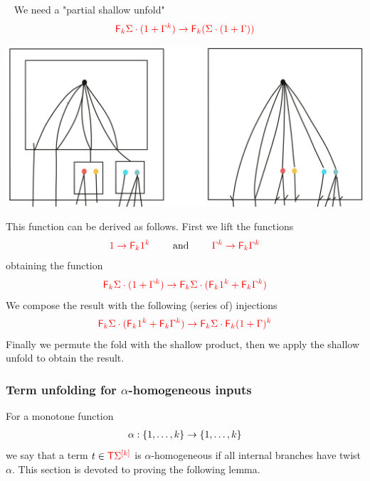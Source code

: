 \begin{example}~\label{ex:PartialShallowUnfold}
We need a "partial shallow unfold"
\begin{align*}
{\color{red}{{\color{red}{\mathsf F_{k}}}\Sigma\cdot (1+\Gamma^k)\to {\color{red}{\mathsf F_{k}}}(\Sigma\cdot(1+\Gamma))}}
\end{align*}
\begin{center}
\includegraphics[scale=.09]{MyPicPartialShallowUnfold.jpg}
\end{center}
This function can be derived as follows. First we lift the functions
\begin{align*}
{\color{red}{1\to {\color{red}{\mathsf F_{k}}}1^k}}\qquad \text{ and } \qquad{\color{red}{\Gamma^k\to {\color{red}{\mathsf F_{k}}}\Gamma^k}}
\end{align*}
obtaining the function
\begin{align*}
{\color{red}{{\color{red}{\mathsf F_{k}}}\Sigma\cdot (1+\Gamma^k)\to {\color{red}{\mathsf F_{k}}}\Sigma\cdot ({\color{red}{\mathsf F_{k}}}1^k+{\color{red}{\mathsf F_{k}}}\Gamma^k) }}
\end{align*}
We compose the result with the following  (series of) injections
\begin{align*}
{\color{red}{{\color{red}{\mathsf F_{k}}}\Sigma\cdot ({\color{red}{\mathsf F_{k}}}1^k+{\color{red}{\mathsf F_{k}}}\Gamma^k)\to {\color{red}{\mathsf F_{k}}}\Sigma\cdot {\color{red}{\mathsf F_{k}}}(1+\Gamma)^k}}
\end{align*}
Finally we permute the fold with the shallow product, then we apply the shallow unfold to obtain the result.
\end{example}


\subsubsection{Term unfolding for $\alpha$-homogeneous inputs}
\label{subsec:alpha-homo-unfold}

For a monotone function 
\begin{align*}
\alpha: \{1,\ldots,k\} \to \{1,\ldots,k\}
\end{align*}
we say that a term $ t \in {\color{red}{\mathsf T}} {\color{red}{\Sigma}}^{{\color{red}{[k]}}}$ is $\alpha$-homogeneous if all internal branches have twist $\alpha$. This section is devoted to proving the following lemma. 

